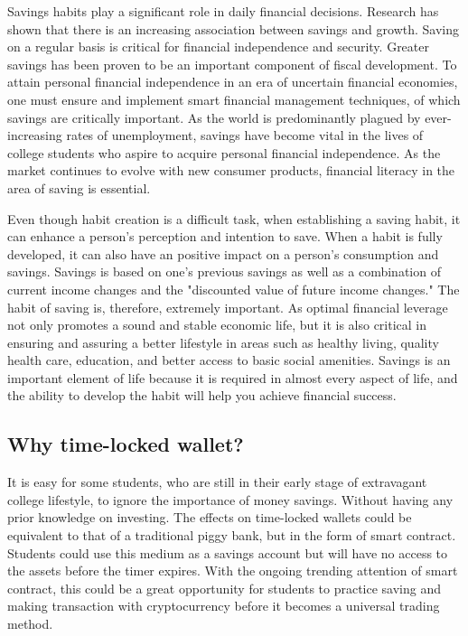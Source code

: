 \documentclass[10pt,twocolumn]{article}
\begin{document}
Savings habits play a significant role in daily financial decisions. Research has shown that there is an increasing association between savings and growth. Saving on a regular basis is critical for financial independence and security. Greater savings has been proven to be an important component of fiscal development. To attain personal financial independence in an era of uncertain financial economies, one must ensure and implement smart financial management techniques, of which savings are critically important. As the world is predominantly plagued by ever-increasing rates of unemployment, savings have become vital in the lives of college students who aspire to acquire personal financial independence.\cite{Fiergbor} As the market continues to evolve with new consumer products, financial literacy in the area of saving is essential.

Even though habit creation is a difficult task, when establishing a saving habit, it can enhance a person's perception and intention to save. When a habit is fully developed, it can also have an positive impact on a person's consumption and savings. Savings is based on one's previous savings as well as a combination of current income changes and the "discounted value of future income changes." The habit of saving is, therefore, extremely important. As optimal financial leverage not only promotes a sound and stable economic life, but it is also critical in ensuring and assuring a better lifestyle in areas such as healthy living, quality health care, education, and better access to basic social amenities.\cite{Alessie} Savings is an important element of life because it is required in almost every aspect of life, and the ability to develop the habit will help you achieve financial success.

\subsection{Why time-locked wallet?}

It is easy for some students, who are still in their early stage of extravagant college lifestyle, to ignore the importance of money savings. Without having any prior knowledge on investing. The effects on time-locked wallets could be equivalent to that of a traditional piggy bank, but in the form of smart contract. Students could use this medium as a savings account but will have no access to the assets before the timer expires. With the ongoing trending attention of smart contract, this could be a great opportunity for students to practice saving and making transaction with cryptocurrency before it becomes a universal trading method.
\end{document}

